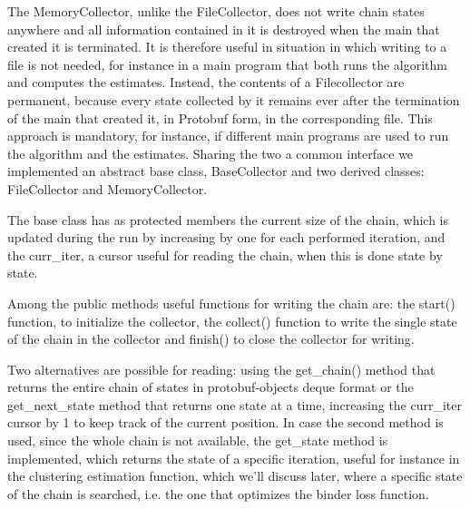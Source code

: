 The MemoryCollector, unlike the FileCollector, does not write chain states anywhere and all information contained in it is destroyed when the main that created it is terminated. It is therefore useful in situation in which writing to a file is not needed, for instance in a main program that both runs the algorithm and computes the estimates.
Instead, the contents of a Filecollector are permanent, because every state collected by it remains ever after the termination of the main that created it, in Protobuf form, in the corresponding file. This approach is mandatory, for instance, if different main programs are used to run the algorithm and the estimates. 
Sharing the two a common interface we implemented an abstract base class, BaseCollector and two derived classes: FileCollector and MemoryCollector.

The base class has as protected members the current size of the chain, which is updated during the run by increasing by one for each performed  iteration, and the curr\_iter, a cursor useful for reading the chain, when this is done state by state.

Among the public methods useful functions for writing the chain are: the start() function, to initialize the collector, the collect() function to write the single state of the chain in the collector and finish() to close the collector for writing. 

Two alternatives are possible for reading: using the get\_chain() method that returns the entire chain of states in protobuf-objects deque format or the get\_next\_state method that returns one state at a time, increasing the curr\_iter cursor by 1 to keep track of the current position. In case the second method is used, since the whole chain is not available, the get\_state method is implemented, which returns the state of a specific iteration, useful for instance in the clustering estimation function, which we'll discuss later, where a specific state of the chain is searched, i.e. the one that optimizes the binder loss function.

